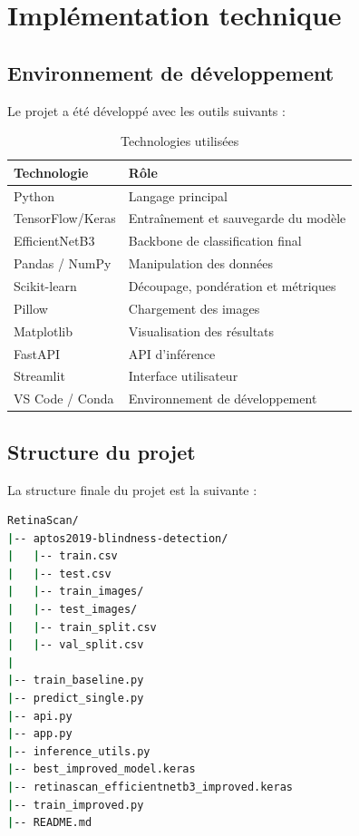 \documentclass[12pt,a4paper]{report}
\begin{document}
\chapter{Implémentation technique}

\section{Environnement de développement}
Le projet a été développé avec les outils suivants :

\begin{table}[H]
\centering
\caption{Technologies utilisées}
\label{tab:tech}
\begin{tabular}{ll}
\toprule
Technologie & Rôle \\
\midrule
Python & Langage principal \\
TensorFlow/Keras & Entraînement et sauvegarde du modèle \\
EfficientNetB3 & Backbone de classification final \\
Pandas / NumPy & Manipulation des données \\
Scikit-learn & Découpage, pondération et métriques \\
Pillow & Chargement des images \\
Matplotlib & Visualisation des résultats \\
FastAPI & API d'inférence \\
Streamlit & Interface utilisateur \\
VS Code / Conda & Environnement de développement \\
\bottomrule
\end{tabular}
\end{table}

\section{Structure du projet}
La structure finale du projet est la suivante :

\begin{lstlisting}[language=bash]
RetinaScan/
|-- aptos2019-blindness-detection/
|   |-- train.csv
|   |-- test.csv
|   |-- train_images/
|   |-- test_images/
|   |-- train_split.csv
|   |-- val_split.csv
|
|-- train_baseline.py
|-- predict_single.py
|-- api.py
|-- app.py
|-- inference_utils.py
|-- best_improved_model.keras
|-- retinascan_efficientnetb3_improved.keras
|-- train_improved.py
|-- README.md
\end{lstlisting}
\end{document}
